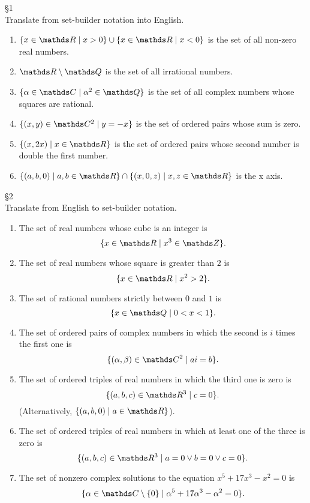\documentclass{review-sheet}
\begin{document}
\begin{problem}{\S 1}\\
  Translate from set-builder notation into English.
\end{problem}
\begin{solution}
  \begin{enumerate}[label=(\alph*)]
    \item $ \{x\in \R\mid x>0\} \cup \{x\in \R\mid x<0\}$ is the set of all non-zero real numbers.
    \item $\R\setminus \Q$ is the set of all irrational numbers.
    \item $\{\alpha\in \C\mid \alpha^2\in \Q\}$ is the set of all complex numbers whose squares are
      rational.
    \item $\{\left( x, y \right) \in \C^2\mid y=-x\}$ is the set of ordered pairs whose sum is
      zero.
    \item $\{\left( x, 2x \right) \mid x\in \R\}$ is the set of ordered pairs whose second number
      is double the first number.
    \item $\{\left( a, b, 0 \right) \mid a, b\in \R\} \cap \{\left( x, 0, z \right) \mid x, z\in
      \R\} $ is the x axis.
  \end{enumerate}
\end{solution}

\begin{problem}{\S 2}\\
  Translate from English to set-builder notation.
\end{problem}
\begin{solution}
  \begin{enumerate}[label=(\alph*)]
  \item The set of real numbers whose cube is an integer is \[
  \{x\in \R\mid x^3\in \Z\} 
  .\]  
  \item The set of real numbers whose square is greater than $2$ is \[
    \{x\in \R\mid x^2>2\} 
  .\] 
  \item The set of rational numbers strictly between $0$ and $1$ is \[
    \{x\in \Q\mid 0 < x < 1\} 
  .\] 
  \item The set of ordered pairs of complex numbers in which the second is $i$ times the first one
    is \[
      \{\left( \alpha, \beta \right) \in \C^2\mid ai = b\}  
    .\] 
  \item The set of ordered triples of real numbers in which the third one is zero is \[
      \{\left( a, b, c \right) \in \R^3\mid c = 0\} 
    .\] (Alternatively, $ \{\left( a, b, 0 \right)\mid a \in \R \} $).
  \item The set of ordered triples of real numbers in which at least one of the three is zero is \[
      \{\left( a, b, c \right) \in \R^3\mid a = 0 \lor b = 0 \lor c = 0\} 
  .\] 
  \item The set of nonzero complex solutions to the equation $x^{5}+17x^3-x^2=0$ is \[
      \{\alpha \in \C\setminus \left\{ 0 \right\}\mid \alpha^{5} + 17\alpha^{3} - \alpha^2 = 0\}
  .\] 
  \end{enumerate}
\end{solution}
\end{document}
